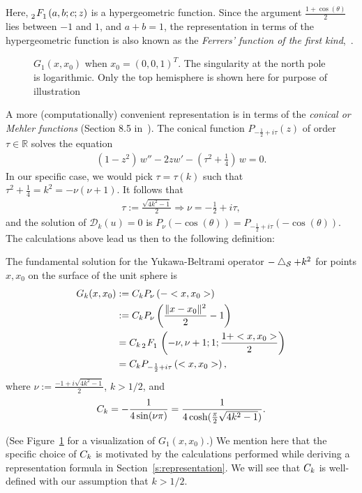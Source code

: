 Here, $\tensor[_2]{F}{_1}(a,b;c;z)$ is a hypergeometric function. Since
the argument $\frac{1+\cos(\theta)}{2}$ lies between $-1$ and $1$, and
$a+b = 1$, the representation in terms of the hypergeometric function is
also known as the {\it Ferrers' function of the first
kind},~\cite{fatAbramowitz}. 

\begin{figure}
  \centering
  
  \caption{\label{f:greensFun} $G_1(x,x_0)$ when $x_0=(0,0,1)^T$. The
  singularity at the north pole is logarithmic. Only the top hemisphere
  is shown here for purpose of illustration}
\end{figure}
A more (computationally) convenient representation is in terms of the
{\it conical or Mehler functions} (Section 8.5 in~\cite{lebedev}). The
conical function $P_{-\frac{1}{2}+ i \tau}(z)$ of order $\tau\in
\mathbb{R}$ solves the equation
\begin{align*}
  (1-z^2)\,w'' -2zw' - \left( \tau^2+\frac{1}{4}\right) \,w = 0.
\end{align*}
In our specific case, we would pick $\tau = \tau(k)$ such that
$\tau^2+\frac{1}{4}=k^2 = -\nu(\nu+1).$  It follows that 
\begin{align*}
  \tau:=\frac{\sqrt{4k^2-1}}{2} \Rightarrow  \nu= -\frac{1}{2}+i\tau, 
\end{align*}
and the solution of $\mathcal{D}_k(u)=0$ is $
  P_{\nu} (-\cos(\theta)) = P_{-\frac{1}{2} + i \tau} 
    (-\cos(\theta)).$
The calculations above lead us then to the following definition:

\begin{definition}
\label{fundamentaldef} 
The fundamental solution for the Yukawa-Beltrami operator $-\bigtriangleup_{\mathcal{S}} +
k^2$ for points $x,x_0$ on the surface of the unit sphere is 
\begin{subequations}
  \begin{align}
    G_k(x,x_{0})&:=\C P_{\nu}\left(-<x,x_{0}>\right) \nonumber \\
    &:=\C P_{\nu}\left(\frac{\|x-x_{0}\|^2}{2}-1\right) \label{LegP} \\
    &= \C\, \tensor[_2]{F}{_1} \left(-\nu, \nu+1; 1; 
      \frac{1+<x,x_{0}>}{2}\right)\label{hyperG} \\
    &=\C P_{-\frac{1}{2} + i \tau}
    \left(<x,x_{0}>\right) \label{conicalP},
  \end{align} 
\end{subequations}
where 
$\nu:=\frac{-1+i\sqrt{4k^2-1}}{2}$, $k>1/2$, and 
\begin{align}
  \label{constant-definition}    
  C_k=-\frac{1}{4\sin(\nu\pi)} 
    =\frac{1}{4\cosh(\frac{\pi}{2}\sqrt{4k^2-1})}.
\end{align}
\end{definition} 
(See Figure~\ref{f:greensFun} for a visualization of $G_1(x,x_0)$.) We
mention here that the specific choice of $C_k$ is motivated by the
calculations performed while deriving a representation formula in
Section~\ref{s:representation}.  We will see that $C_k$ is well-defined
with our assumption that $k>1/2$.


